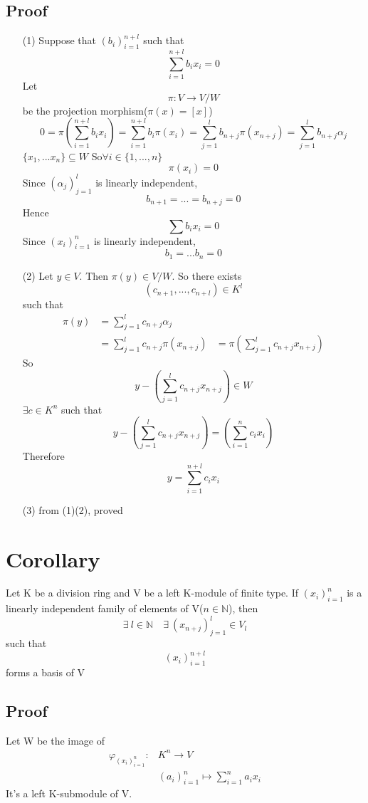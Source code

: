 \documentclass{book}
\begin{document}
\subsection*{Proof}
\begin{itemize}
    \item [(1)]Suppose that $(b_i)_{i=1}^{n+l}$ such that $$\sum\limits_{i=1}^{n+l}b_ix_i=0$$Let 
    $$\pi:V\rightarrow V/W$$ be the projection morphism($\pi(x)=[x]$)
    $$0=\pi(\sum\limits_{i=1}^{n+l}b_ix_i)=\sum\limits_{i=1}^{n+l}b_i\pi(x_i)=\sum\limits_{j=1}^{l}b_{n+j}\pi(x_{n+j})=\sum\limits_{j=1}^l b_{n+j}\alpha_j$$
    $\{x_1,...x_n\}\subseteq W$ So$\forall i\in \{1,...,n\}$$$\pi(x_i)=0$$
    Since $(\alpha_j)_{j=1}^l$ is linearly independent, $$b_{n+1}=...=b_{n+j}=0$$
    Hence $$\sum b_ix_i=0$$
    Since $(x_i)_{i=1}^n$ is linearly independent,$$b_1=...b_n=0$$
    \item[(2)]Let $y\in V$. Then $\pi(y)\in V/W$. So there exists $$(c_{n+1},...,c_{n+l})\in K^l$$
    such that$$\begin{aligned}
        \pi(y)&=\sum\limits_{j=1}^l c_{n+j}\alpha_j\\
        &=\sum\limits_{j=1}^l c_{n+j}\pi(x_{n+j})
        &=\pi(\sum\limits_{j=1}^l c_{n+j}x_{n+j})
    \end{aligned} $$
    So $$y-(\sum\limits_{j=1}^lc_{n+j}x_{n+j})\in W$$
    $\exists c\in K^n$ such that
    $$y-(\sum\limits_{j=1}^lc_{n+j}x_{n+j})=(\sum\limits_{i=1}^nc_{i}x_{i})$$
    Therefore $$y=\sum\limits_{i=1}^{n+l}c_ix_i$$
    \item[(3)]from (1)(2), proved
\end{itemize}
\section{Corollary}
Let K be a division ring and V be a left K-module of finite type. If $(x_i)_{i=1}^n$ is a linearly independent family of elements of V($n\in \mathbb{N}$), then  $$\exists\ l\in \mathbb{N}\quad\exists\ (x_{n+j})_{j=1}^l\in V_l$$ such that $$(x_i)_{i=1}^{n+l}$$ forms a basis of V
\subsection*{Proof}
Let W be the image of $$\begin{aligned}
\varphi_(x_i)_{i=1}^n:&K^{n}\rightarrow V\\ &(a_i)^n_{i=1}\mapsto\sum\limits_{i=1}^na_ix_i
\end{aligned}$$
It's a left K-submodule of V. 
\end{document}
